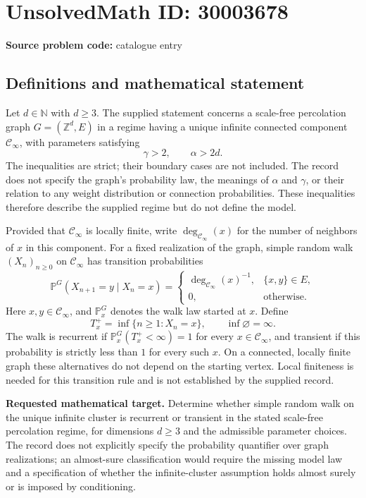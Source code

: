 \documentclass[11pt]{article}
\newcommand{\N}{\mathbb{N}}
\newcommand{\Z}{\mathbb{Z}}
\begin{document}
\section*{UnsolvedMath ID: 30003678}
\textbf{Source problem code:} catalogue entry
\subsection{Definitions and mathematical statement}
Let \(d\in\N\) with \(d\geq3\). The supplied statement concerns a scale-free percolation graph \(G=(\Z^d,E)\) in a regime having a unique infinite connected component \(\mathcal C_\infty\), with parameters satisfying
\[
\gamma>2,\qquad \alpha>2d.
\]
The inequalities are strict; their boundary cases are not included. The record does not specify the graph's probability law, the meanings of \(\alpha\) and \(\gamma\), or their relation to any weight distribution or connection probabilities. These inequalities therefore describe the supplied regime but do not define the model.

Provided that \(\mathcal C_\infty\) is locally finite, write \(\deg_{\mathcal C_\infty}(x)\) for the number of neighbors of \(x\) in this component. For a fixed realization of the graph, simple random walk \((X_n)_{n\geq0}\) on \(\mathcal C_\infty\) has transition probabilities
\[
\mathbb P^G(X_{n+1}=y\mid X_n=x)
=
\begin{cases}
\deg_{\mathcal C_\infty}(x)^{-1},&\{x,y\}\in E,\\
0,&\text{otherwise}.
\end{cases}
\]
Here \(x,y\in\mathcal C_\infty\), and \(\mathbb P_x^G\) denotes the walk law started at \(x\). Define
\[
T_x^+=\inf\{n\geq1:X_n=x\},\qquad \inf\varnothing=\infty.
\]
The walk is recurrent if \(\mathbb P_x^G(T_x^+<\infty)=1\) for every \(x\in\mathcal C_\infty\), and transient if this probability is strictly less than \(1\) for every such \(x\). On a connected, locally finite graph these alternatives do not depend on the starting vertex. Local finiteness is needed for this transition rule and is not established by the supplied record.

\textbf{Requested mathematical target.} Determine whether simple random walk on the unique infinite cluster is recurrent or transient in the stated scale-free percolation regime, for dimensions \(d\geq3\) and the admissible parameter choices. The record does not explicitly specify the probability quantifier over graph realizations; an almost-sure classification would require the missing model law and a specification of whether the infinite-cluster assumption holds almost surely or is imposed by conditioning.
\end{document}
